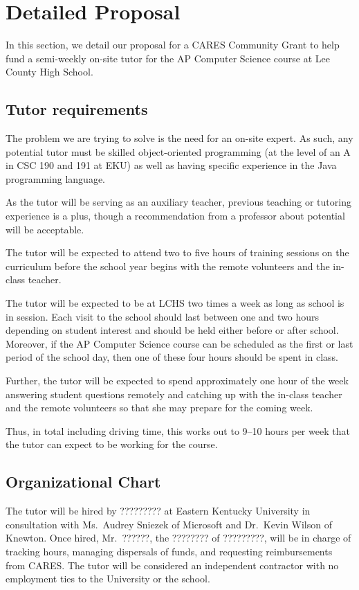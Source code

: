 \section{Detailed Proposal}\label{sec:proposal}

In this section, we detail our proposal for a CARES Community Grant to help
fund a semi-weekly on-site tutor for the AP Computer Science course at
Lee County High School.

\subsection{Tutor requirements}\label{ssec:tutor}

The problem we are trying to solve is the need for an on-site expert. As such,
any potential tutor must be skilled object-oriented programming (at the level
of an A in CSC 190 and 191 at EKU) as well as having specific experience in
the Java programming language.

As the tutor will be serving as an auxiliary teacher, previous teaching or
tutoring experience is a plus, though a recommendation from a professor
about potential will be acceptable.

The tutor will be expected to attend two to five hours of training sessions
on the curriculum before the school year begins with the remote volunteers
and the in-class teacher.

The tutor will be expected to be at LCHS two times a week as long as school is
in session. Each visit to the school should last between one and two hours
depending on student interest and should be held either before or after school.
Moreover, if the AP Computer Science course can be scheduled as the first or
last period of the school day, then one of these four hours should be spent
in class.

Further, the tutor will be expected to spend approximately one hour of the week
answering student questions remotely and catching up with the in-class teacher
and the remote volunteers so that she may prepare for the coming week.

Thus, in total including driving time, this works out to 9--10 hours per week
that the tutor can expect to be working for the course.

\subsection{Organizational Chart}\label{ssec:orgchart}

The tutor will be hired by ????????? at Eastern Kentucky University in
consultation with Ms.~Audrey Sniezek of Microsoft and Dr.~Kevin Wilson
of Knewton. Once hired, Mr.~??????, the ???????? of ?????????, will be in charge
of tracking hours, managing dispersals of funds, and requesting reimbursements
from CARES. The tutor will be considered an independent contractor with no
employment ties to the University or the school.

